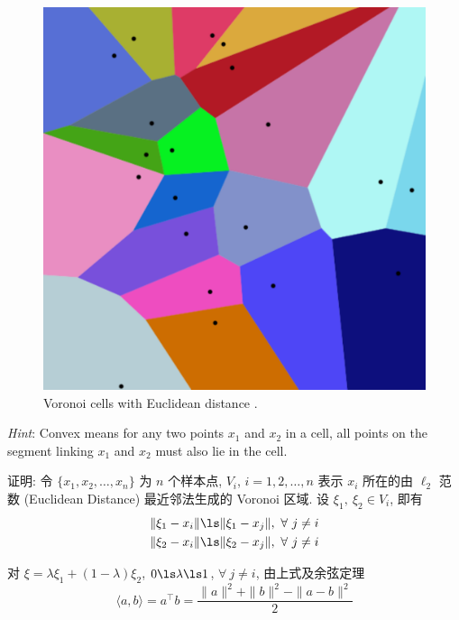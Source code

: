 \documentclass[openany]{ctexbook}
\theoremstyle{kaiti}
\theoremstyle{normal}
\begin{document}
\begin{figure}[ht]
	\centering
	\includegraphics[scale=0.3]{Euclidean_Voronoi_diagram.pdf}
	\caption{Voronoi cells with Euclidean distance \cite{pics}.}
	\label{pic1}
\end{figure}

\emph{Hint}: Convex means for any two points $x_1$ and $x_2$ in a cell, all points on the segment linking $x_1$ and $x_2$ must also lie in the cell.

证明: 令 $\{x_1,x_2,\dots,x_n\}$ 为 $n$ 个样本点, $V_i$, $i=1,2,\dots,n$ 表示 $x_i$ 所在的由 $\ell_2$ 范数 (Euclidean Distance) 最近邻法生成的 Voronoi 区域. 设 $\xi_1,~\xi_2\in V_i$, 即有
\begin{equation}
  \begin{aligned}
    \|\xi_1-x_i\|&\ls\|\xi_1-x_j\|,~\forall~j\neq i\\
    \|\xi_2-x_i\|&\ls\|\xi_2-x_j\|,~\forall~j\neq i\\
  \end{aligned}
\end{equation}

对 $\xi=\lambda\xi_1+(1-\lambda)\xi_2$, $0\ls\lambda\ls1$, $\forall~j\neq i$, 由上式及余弦定理
\begin{equation}
  \langle a,b\rangle = a^\top b = \frac{\|a\|^2+\|b\|^2-\|a-b\|^2}{2}
\end{equation}
\end{document}
